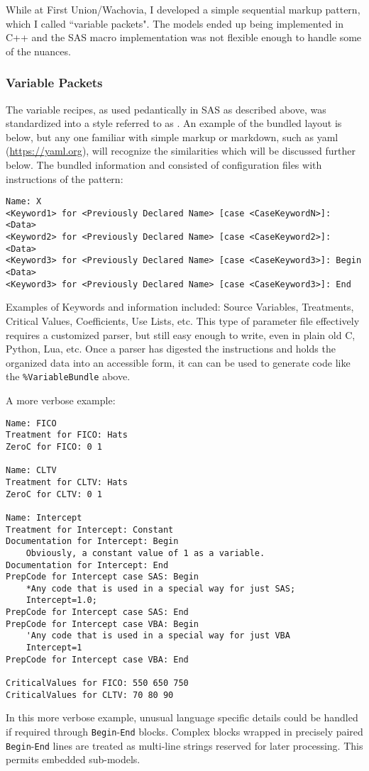 \documentclass[10pt]{article}
\begin{document}
While at First Union/Wachovia, I developed a simple sequential markup pattern, 
which I called ``variable packets".  The models ended up being implemented in C++ and the SAS macro implementation was not flexible enough
to handle some of the nuances.

\fi 

\subsubsection{Variable Packets}

The variable recipes, as used pedantically in SAS as described above, was standardized into a style referred to as .  An example of the bundled layout is below, but any one familiar with simple markup or markdown, such as yaml
(\url{https://yaml.org}), will recognize the similarities which will be discussed further below.  The bundled information and consisted of
configuration files with instructions of the pattern:
\begin{Verbatim}[fontsize=\small,baselinestretch=0.75,formatcom=\color{red}]
Name: X
<Keyword1> for <Previously Declared Name> [case <CaseKeywordN>]: <Data>
<Keyword2> for <Previously Declared Name> [case <CaseKeyword2>]: <Data>
<Keyword3> for <Previously Declared Name> [case <CaseKeyword3>]: Begin
<Data>
<Keyword3> for <Previously Declared Name> [case <CaseKeyword3>]: End
\end{Verbatim}


Examples of Keywords and information included: Source Variables, Treatments, Critical Values, Coefficients, Use Lists, etc.  
This type of parameter file effectively requires a customized parser, but still easy enough to write, even in plain old C, Python, Lua, etc. 
Once a parser has digested the instructions and holds the organized data into an accessible form, it can can be used to generate
code like the \verb+%VariableBundle+ above.  

A more verbose example:
\begin{Verbatim}[fontsize=\small,baselinestretch=0.75,formatcom=\color{red}]
Name: FICO
Treatment for FICO: Hats
ZeroC for FICO: 0 1

Name: CLTV
Treatment for CLTV: Hats
ZeroC for CLTV: 0 1

Name: Intercept
Treatment for Intercept: Constant
Documentation for Intercept: Begin
    Obviously, a constant value of 1 as a variable.
Documentation for Intercept: End
PrepCode for Intercept case SAS: Begin
    *Any code that is used in a special way for just SAS;
    Intercept=1.0;
PrepCode for Intercept case SAS: End
PrepCode for Intercept case VBA: Begin
    'Any code that is used in a special way for just VBA
    Intercept=1
PrepCode for Intercept case VBA: End

CriticalValues for FICO: 550 650 750
CriticalValues for CLTV: 70 80 90 
\end{Verbatim}
In this more verbose example, unusual language specific details could be handled if required through {\tt Begin}-{\tt End} blocks.  
Complex blocks wrapped in precisely paired {\tt Begin}-{\tt End} lines are treated as multi-line strings reserved for later processing.
This permits embedded sub-models.
\end{document}
